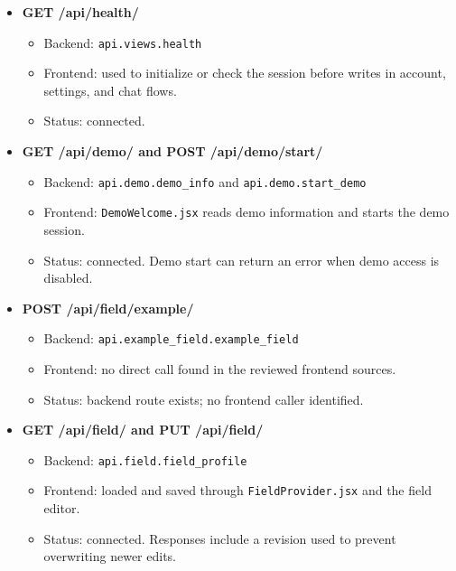 \documentclass[11pt]{article}
\begin{document}
\begin{itemize}[leftmargin=1.5em, itemsep=0.55em]

\item \textbf{GET /api/health/}
  \begin{itemize}[leftmargin=1.5em, itemsep=0.2em]
    \item Backend: \texttt{api.views.health}
    \item Frontend: used to initialize or check the session before writes in account, settings, and chat flows.
    \item Status: connected.
  \end{itemize}

\item \textbf{GET /api/demo/ and POST /api/demo/start/}
  \begin{itemize}[leftmargin=1.5em, itemsep=0.2em]
    \item Backend: \texttt{api.demo.demo\_info} and \texttt{api.demo.start\_demo}
    \item Frontend: \texttt{DemoWelcome.jsx} reads demo information and starts the demo session.
    \item Status: connected. Demo start can return an error when demo access is disabled.
  \end{itemize}

\item \textbf{POST /api/field/example/}
  \begin{itemize}[leftmargin=1.5em, itemsep=0.2em]
    \item Backend: \texttt{api.example\_field.example\_field}
    \item Frontend: no direct call found in the reviewed frontend sources.
    \item Status: backend route exists; no frontend caller identified.
  \end{itemize}

\item \textbf{GET /api/field/ and PUT /api/field/}
  \begin{itemize}[leftmargin=1.5em, itemsep=0.2em]
    \item Backend: \texttt{api.field.field\_profile}
    \item Frontend: loaded and saved through \texttt{FieldProvider.jsx} and the field editor.
    \item Status: connected. Responses include a revision used to prevent overwriting newer edits.
  \end{itemize}


\end{itemize}
\end{document}

